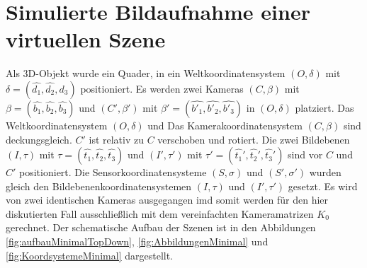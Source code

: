 \pagebreak

%



\section{Simulierte Bildaufnahme einer virtuellen Szene}

Als 3D-Objekt wurde ein Quader, in ein Weltkoordinatensystem $(O,\delta)$ mit $\delta = (\hat{d_1},\hat{d_2},\hat{d_3})$ positioniert. Es werden zwei Kameras $(C,\beta)$ mit $\beta = (\hat{b_1},\hat{b_2},\hat{b_3})$ und $(C',\beta')$ mit $\beta' = (\hat{b'_1},\hat{b'_2},\hat{b'_3})$ in $(O,\delta)$ platziert. Das Weltkoordinatensystem $(O,\delta)$ und Das Kamerakoordinatensystem $(C,\beta)$ sind deckungsgleich. $C'$ ist relativ zu $C$ verschoben und rotiert. Die zwei Bildebenen $(I,\tau)$ mit $\tau = (\hat{t_1},\hat{t_2},\hat{t_3})$ und $(I',\tau')$ mit $\tau' = (\hat{t_1}',\hat{t_2}',\hat{t_3}')$ sind vor $C$ und $C'$ positioniert. Die Sensorkoordinatensysteme $(S,\sigma)$ und $(S',\sigma')$ wurden gleich den Bildebenenkoordinatensystemen $(I,\tau)$ und $(I',\tau')$ gesetzt. Es wird von zwei identischen Kameras ausgegangen imd somit werden  für den hier diskutierten Fall ausschließlich mit dem vereinfachten Kameramatrizen $K_0$ gerechnet. Der schematische Aufbau der Szenen ist in den Abbildungen \ref{fig:aufbauMinimalTopDown}, \ref{fig:AbbildungenMinimal} und \ref{fig:KoordsystemeMinimal} dargestellt.




